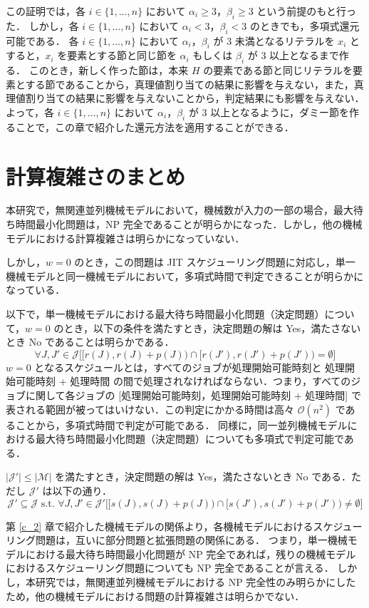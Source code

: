\documentclass[12pt]{optlab-bachelor}
\begin{document}
この証明では，各 $i \in \{1,\ldots,n\}$ において $\alpha_i \ge 3$，$\beta_i \ge 3$ という前提のもと行った．
しかし，各 $i \in \{1,\ldots,n\}$ において $\alpha_i < 3$，$\beta_i < 3$ のときでも，多項式還元可能である．
各 $i \in \{1,\ldots,n\}$ において $\alpha_i$，$\beta_i$ が 3 未満となるリテラルを $x_i$ とすると，$x_i$ を要素とする節と同じ節を $\alpha_i$ もしくは $\beta_i$ が 3 以上となるまで作る．
このとき，新しく作った節は，本来 $H$ の要素である節と同じリテラルを要素とする節であることから，真理値割り当ての結果に影響を与えない，また，真理値割り当ての結果に影響を与えないことから，判定結果にも影響を与えない．
よって，各 $i \in \{1,\ldots,n\}$ において $\alpha_i$，$\beta_i$ が 3 以上となるように，ダミー節を作ることで，この章で紹介した還元方法を適用することができる．

\section{計算複雑さのまとめ}\label{4_s_2}
本研究で，無関連並列機械モデルにおいて，機械数が入力の一部の場合，最大待ち時間最小化問題は，NP 完全であることが明らかになった．しかし，他の機械モデルにおける計算複雑さは明らかになっていない．

しかし，$w = 0$ のとき，この問題は JIT スケジューリング問題に対応し，単一機械モデルと同一機械モデルにおいて，多項式時間で判定できることが明らかになっている．

以下で，単一機械モデルにおける最大待ち時間最小化問題（決定問題）について，$w = 0$ のとき，以下の条件を満たすとき，決定問題の解は Yes，満たさないとき No であることは明らかである．
$$\forall J,J' \in \mathcal{J}\bigg[\big[r(J),r(J) + p(J)\big) \cap \big[r(J'),r(J') + p(J')\big) = \emptyset\bigg]$$
$w = 0$ となるスケジュールとは，すべてのジョブが処理開始可能時刻と 処理開始可能時刻 + 処理時間 の間で処理されなければならない．つまり，すべてのジョブに関して各ジョブの [処理開始可能時刻，処理開始可能時刻 + 処理時間] で表される範囲が被ってはいけない．この判定にかかる時間は高々 $\mathcal{O}(n^2)$ であることから，多項式時間で判定が可能である．
同様に，同一並列機械モデルにおける最大待ち時間最小化問題（決定問題）についても多項式で判定可能である．

$|\mathcal{J}'| \le |\mathcal{M}|$ を満たすとき，決定問題の解は Yes，満たさないとき No である．ただし $\mathcal{J}'$ は以下の通り．
$$\mathcal{J}' \subseteq \mathcal{J} \text{ s.t. }\forall J,J' \in \mathcal{J}'\bigg[\big[s(J),s(J) + p(J)\big) \cap \big[s(J'),s(J') + p(J')\big) \neq \emptyset\bigg]$$

第 \ref{c_2} 章で紹介した機械モデルの関係より，各機械モデルにおけるスケジューリング問題は，互いに部分問題と拡張問題の関係にある．
つまり，単一機械モデルにおける最大待ち時間最小化問題が NP 完全であれば，残りの機械モデルにおけるスケジューリング問題についても NP 完全であることが言える．
しかし，本研究では，無関連並列機械モデルにおける NP 完全性のみ明らかにしたため，他の機械モデルにおける問題の計算複雑さは明らかでない．
\end{document}
